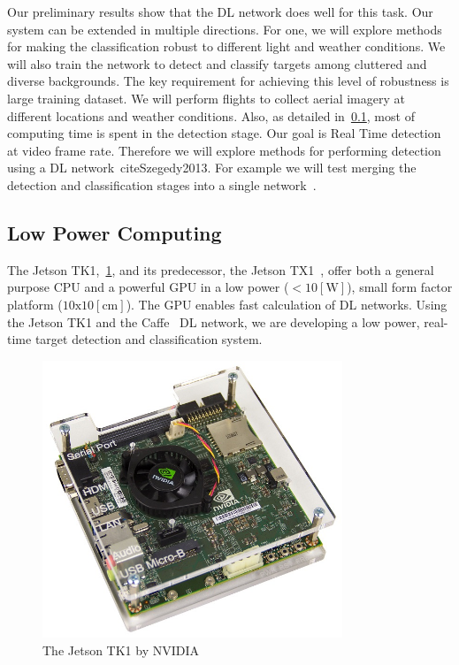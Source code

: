 \documentclass[a4paper]{article} %
\begin{document}
Our preliminary results show that the DL network does well for this task. Our
system can be extended in multiple directions. For one, we will explore
methods for making the classification robust to different light and weather
conditions. We will also train the network to detect and classify targets among
cluttered and diverse backgrounds. The key requirement for achieving this level
of robustness is large training dataset. We will perform flights to collect
aerial imagery at different locations and weather conditions. Also, as detailed
in~\cref{sec:low_power_computing}, most of computing time is spent in the detection
stage. Our goal is Real Time detection at video frame rate. Therefore we will
explore methods for performing detection using a DL network~cite{Szegedy2013}.
For example we will test merging the detection and classification stages into a
single network~\cite{long2014fully}.

\subsection{Low Power Computing}
\label{sec:low_power_computing}

The Jetson TK1,~\cref{fig:jetson}, and its predecessor, the Jetson
TX1~\cite{jetsontk}, offer both a general purpose CPU and a powerful GPU in a
low power ($<10[\textrm{W}]$), small form factor platform
($10\textrm{x}10[\textrm{cm}]$). The GPU enables fast calculation of DL
networks. Using the Jetson TK1 and the Caffe~\cite{jia2014caffe} DL network, we
are developing a low power, real-time target detection and classification
system.
\begin{figure}[h]
	\centering
	\includegraphics[width=0.8\textwidth]{jetson}
	\caption{The Jetson TK1 by NVIDIA}
	\label{fig:jetson}
\end{figure}
\end{document}
